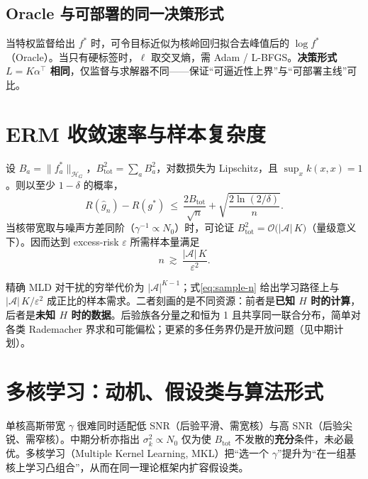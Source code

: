 \subsection{Oracle 与可部署的同一决策形式}
当特权监督给出 $f^*$ 时，可令目标近似为核岭回归拟合去峰值后的 $\log f^*$（Oracle）。当只有硬标签时，$\ell$ 取交叉熵，需 Adam / L-BFGS。\textbf{决策形式 $L=K\alpha^\top$ 相同}，仅监督与求解器不同——保证“可逼近性上界”与“可部署主线”可比。

\section{ERM 收敛速率与样本复杂度}

\begin{theorem}
\label{thm:erm-rate}
设 $B_a=\|f_a^*\|_{\mathcal{H}_G}$，$B_{\mathrm{tot}}^2=\sum_a B_a^2$，对数损失为 Lipschitz，且 $\sup_x k(x,x)=1$。则以至少 $1-\delta$ 的概率\cite{bartlett2002}，
\begin{equation}
R(\hat g_n)-R(g^*)
\ \le\
\frac{2B_{\mathrm{tot}}}{\sqrt{n}}
+\sqrt{\frac{2\ln(2/\delta)}{n}}.
\label{eq:excess}
\end{equation}
当核带宽取与噪声方差同阶（$\gamma^{-1}\propto N_0$）时，可论证
$B_{\mathrm{tot}}^2=\mathcal{O}\big(|\mathcal{A}|\,K\big)$（量级意义下）。因而达到 excess-risk $\varepsilon$ 所需样本量满足
\begin{equation}
n\ \gtrsim\ \frac{|\mathcal{A}|\,K}{\varepsilon^2}.
\label{eq:sample-n}
\end{equation}
\end{theorem}

\begin{remark}[与穷举复杂度的对照]
精确 MLD 对干扰的穷举代价为 $|\mathcal{A}|^{K-1}$；式\eqref{eq:sample-n} 给出学习路径上与 $|\mathcal{A}|\,K/\varepsilon^2$ 成正比的样本需求。二者刻画的是不同资源：前者是\textbf{已知 $H$ 时的计算}，后者是\textbf{未知 $H$ 时的数据}。后验族各分量之和恒为 1 且共享同一联合分布，简单对各类 Rademacher 界求和可能偏松；更紧的多任务界仍是开放问题（见中期计划）。
\end{remark}

\section{多核学习：动机、假设类与算法形式}
\label{sec:mkl}

单核高斯带宽 $\gamma$ 很难同时适配低 SNR（后验平滑、需宽核）与高 SNR（后验尖锐、需窄核）。中期分析亦指出 $\sigma_k^2\propto N_0$ 仅为使 $B_{\mathrm{tot}}$ 不发散的\textbf{充分}条件，未必最优。多核学习（Multiple Kernel Learning, MKL）把“选一个 $\gamma$”提升为“在一组基核上学习凸组合”，从而在同一理论框架内扩容假设类\cite{bach2004,micchelli2005,cortes2009,rakotomamonjy2008}。

